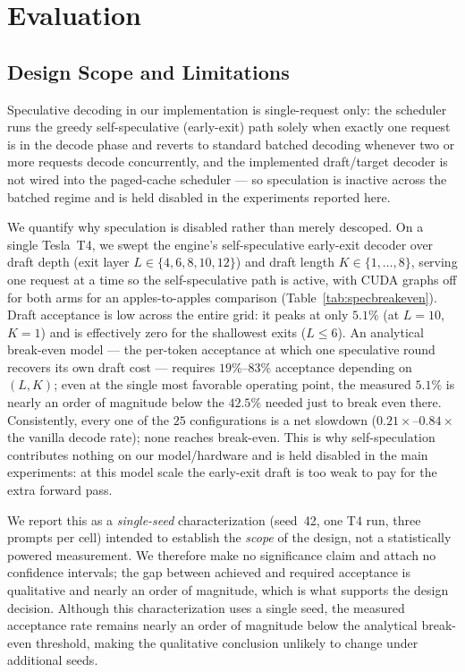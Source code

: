 \section{Evaluation}

\subsection{Design Scope and Limitations}
\label{sec:limitations}

Speculative decoding in our implementation is single-request only: the
scheduler runs the greedy self-speculative (early-exit) path solely when
exactly one request is in the decode phase and reverts to standard
batched decoding whenever two or more requests decode concurrently, and
the implemented draft/target decoder is not wired into the paged-cache
scheduler --- so speculation is inactive across the batched regime and is
held disabled in the experiments reported here.

We quantify why speculation is disabled rather than merely descoped. On a
single Tesla~T4, we swept the engine's self-speculative early-exit decoder
over draft depth (exit layer $L\in\{4,6,8,10,12\}$) and draft length
$K\in\{1,\dots,8\}$, serving one request at a time so the self-speculative
path is active, with CUDA graphs off for both arms for an apples-to-apples
comparison (Table~\ref{tab:specbreakeven}). Draft acceptance is low across
the entire grid: it peaks at only $5.1\%$ (at $L{=}10$, $K{=}1$) and is
effectively zero for the shallowest exits ($L{\le}6$). An analytical
break-even model --- the per-token acceptance at which one speculative round
recovers its own draft cost --- requires $19\%$--$83\%$ acceptance depending
on $(L,K)$; even at the single most favorable operating point, the measured
$5.1\%$ is nearly an order of magnitude below the $42.5\%$ needed just to
break even there. Consistently, every one of the $25$ configurations is a net
slowdown ($0.21\times$--$0.84\times$ the vanilla decode rate); none reaches
break-even. This is why self-speculation contributes nothing on our
model/hardware and is held disabled in the main experiments: at this model
scale the early-exit draft is too weak to pay for the extra forward pass.

We report this as a \emph{single-seed} characterization (seed~42, one T4 run,
three prompts per cell) intended to establish the \emph{scope} of the design,
not a statistically powered measurement. We therefore make no significance
claim and attach no confidence intervals; the gap between achieved and
required acceptance is qualitative and nearly an order of magnitude, which is
what supports the design decision. Although this characterization uses a
single seed, the measured acceptance rate remains nearly an order of
magnitude below the analytical break-even threshold, making the qualitative
conclusion unlikely to change under additional seeds.

